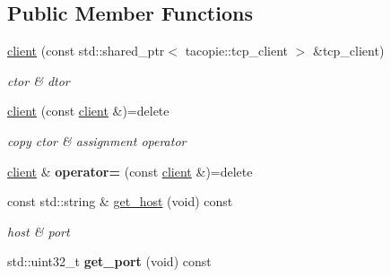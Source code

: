 \subsection*{Public Member Functions}
\begin{DoxyCompactItemize}
\item 
\mbox{\label{classnetflex_1_1http_1_1client_a0b14a82f29bad24559d159f9459895a6}} 
\hyperlink{classnetflex_1_1http_1_1client_a0b14a82f29bad24559d159f9459895a6}{client} (const std\+::shared\+\_\+ptr$<$ tacopie\+::tcp\+\_\+client $>$ \&tcp\+\_\+client)
\begin{DoxyCompactList}\small\item\em ctor \& dtor \end{DoxyCompactList}\item 
\mbox{\label{classnetflex_1_1http_1_1client_af13de483802dc1096a13870d9ecf5fa9}} 
\hyperlink{classnetflex_1_1http_1_1client_af13de483802dc1096a13870d9ecf5fa9}{client} (const \hyperlink{classnetflex_1_1http_1_1client}{client} \&)=delete
\begin{DoxyCompactList}\small\item\em copy ctor \& assignment operator \end{DoxyCompactList}\item 
\mbox{\label{classnetflex_1_1http_1_1client_acc99fbf45017b7593e1c2851487ebb88}} 
\hyperlink{classnetflex_1_1http_1_1client}{client} \& {\bfseries operator=} (const \hyperlink{classnetflex_1_1http_1_1client}{client} \&)=delete
\item 
\mbox{\label{classnetflex_1_1http_1_1client_a30d5d978725c09449266ea86e4dd130b}} 
const std\+::string \& \hyperlink{classnetflex_1_1http_1_1client_a30d5d978725c09449266ea86e4dd130b}{get\+\_\+host} (void) const
\begin{DoxyCompactList}\small\item\em host \& port \end{DoxyCompactList}\item 
\mbox{\label{classnetflex_1_1http_1_1client_a9d64406a2b36fa59610798ee9abcf735}} 
std\+::uint32\+\_\+t {\bfseries get\+\_\+port} (void) const
\item 
\mbox{\label{classnetflex_1_1http_1_1client_a69d20e66a63e3911104b309b8bfb72d0}} 

\end{DoxyCompactItemize}
